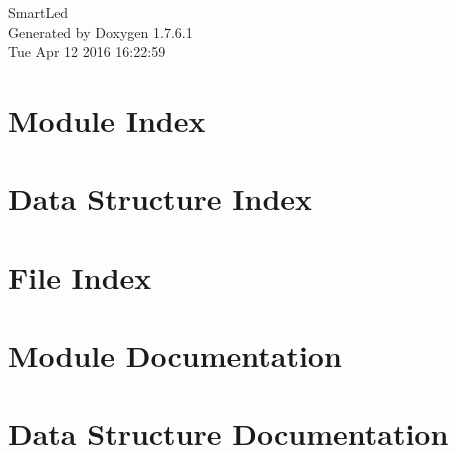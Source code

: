 \documentclass[a4paper]{book}
\begin{document}
\hypersetup{pageanchor=false,citecolor=blue}
\begin{titlepage}
\vspace*{7cm}
\begin{center}
{\Large \-Smart\-Led }\\
\vspace*{1cm}
{\large \-Generated by Doxygen 1.7.6.1}\\
\vspace*{0.5cm}
{\small Tue Apr 12 2016 16:22:59}\\
\end{center}
\end{titlepage}
\clearemptydoublepage
{}
\tableofcontents
\clearemptydoublepage
{}
\hypersetup{pageanchor=true,citecolor=blue}
\chapter{\-Module \-Index}

\chapter{\-Data \-Structure \-Index}

\chapter{\-File \-Index}

\chapter{\-Module \-Documentation}























\chapter{\-Data \-Structure \-Documentation}





























\end{document}
